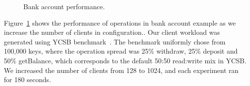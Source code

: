 \begin{figure}
  \centering
	\caption{Bank account performance.}
  \label{grf:BA}
\end{figure}

Figure~\ref{grf:BA} shows the performance of operations in bank account example
as we increase the number of clients in  configuration.. Our client
workload was generated using YCSB benchmark~\cite{YCSB}. The benchmark
uniformly chose from 100,000 keys, where the operation spread was 25\%
withdraw, 25\% deposit and 50\% getBalance, which corresponds to the default
50:50 read:write mix in YCSB. We increased the number of clients from 128 to
1024, and each experiment ran for 180 seconds.

